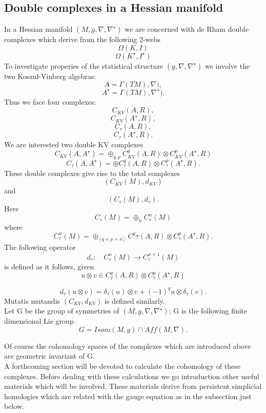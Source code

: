 \subsection{Double complexes in a Hessian manifold}
In a Hessian manifold $(M,g,\nabla,\nabla^\star)$ we are concerned with de Rham double complexes which derive from the following 2-webs
$$\Omega(K,I)$$
$$\Omega(K^\star,I^\star)$$
To investigate properies of the statistical structure  $(g,\nabla,\nabla^\star)$ we involve the two Koszul-Vinberg algebras:
$$A = \Gamma(TM), \nabla),$$
$$A^\star = \Gamma(TM),\nabla^\star).$$
Thus we face four complexes:
$$C_{KV}(A,R),$$
$$C_{KV}(A^\star,R),$$
$$C_\tau(A,R),$$
$$C_\tau(A^\star,R).$$
We are interested two double KV complexes
$$C_{KV}(A,A^\star) = \oplus_{q,p}C^q_{KV}(A,R)\otimes C^p_{KV}(A^\star,R)$$
$$C_\tau(A,A^\star) = \oplus C^q_\tau(A,R)\otimes C^p_\tau(A^\star,R).$$
These double complexes give rise to the total complexes $$(C_{KV}(M),d_{KV})$$
and $$(C_\tau(M), d_\tau).$$
Here
$$C_\tau(M) = \oplus_n C^n_\tau(M)$$
where $$C^n_\tau(M) = \oplus_{[q+p = n]}C^q\tau(A,R)\otimes C^p_\tau(A^\star,R).$$
The following operator
$$d_\tau:\quad C^n_\tau(M)\rightarrow C^{n+1}_\tau(M)$$
is defined as it follows, given 
$$u\otimes v \in C^q_\tau(A,R)\otimes C^p_\tau(A^\star,R)$$

$$d_\tau(u\otimes v) = \delta_\tau(u)\otimes v + (-1)^q u\otimes \delta_\tau(v).$$
Mutatis mutandis $(C_{KV},d_{KV})$ is defined similarly.\\
Let G be the group of symmetries of $(M,g,\nabla,\nabla^\star)$; G is the following finite dimensional Lie group 
$$G = Isom(M,g)\cap Aff(M,\nabla).$$

Of course the cohomology spaces of the complexes which are introduced above are geometric invariant of G.\\

\textit{}A forthcoming section will be devoted to calculate the cohomology of these complexes. Before dealing with these calculations we go introduction other useful materials which will be involved. These materials derive from persistent simplicial homologies which are related with the gauge equation as in the subsection just below.\\
